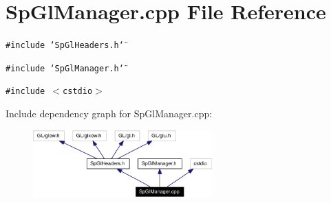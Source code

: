 \section{Sp\-Gl\-Manager.cpp File Reference}
\label{SpGlManager_8cpp}
{\tt \#include \char`\"{}Sp\-Gl\-Headers.h\char`\"{}}\par
{\tt \#include \char`\"{}Sp\-Gl\-Manager.h\char`\"{}}\par
{\tt \#include $<$cstdio$>$}\par


Include dependency graph for Sp\-Gl\-Manager.cpp:\begin{figure}[H]
\begin{center}
\leavevmode
\includegraphics[width=195pt]{SpGlManager_8cpp__incl}
\end{center}
\end{figure}
